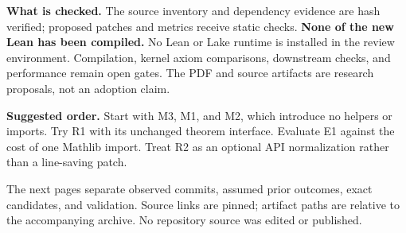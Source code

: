 \textbf{What is checked.} The source inventory and dependency evidence are hash verified; proposed patches and metrics receive static checks. \textbf{None of the new Lean has been compiled.} No Lean or Lake runtime is installed in the review environment. Compilation, kernel axiom comparisons, downstream checks, and performance remain open gates. The PDF and source artifacts are research proposals, not an adoption claim.

\textbf{Suggested order.} Start with M3, M1, and M2, which introduce no helpers or imports. Try R1 with its unchanged theorem interface. Evaluate E1 against the cost of one Mathlib import. Treat R2 as an optional API normalization rather than a line-saving patch.

The next pages separate observed commits, assumed prior outcomes, exact candidates, and validation. Source links are pinned; artifact paths are relative to the accompanying archive. No repository source was edited or published.
